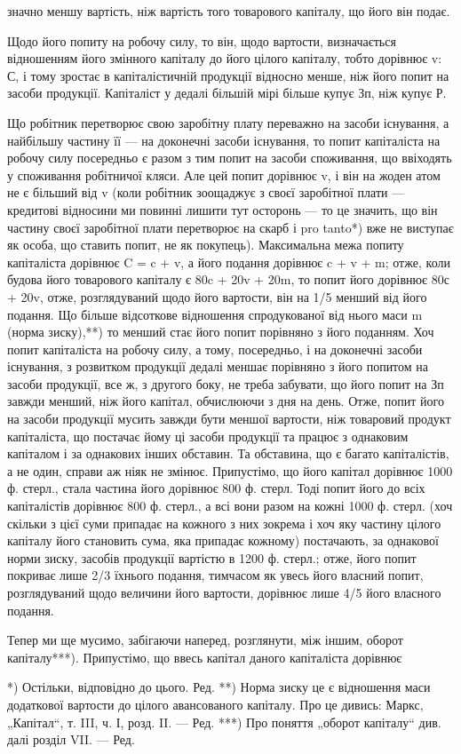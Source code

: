 значно меншу вартість, ніж вартість того товарового капіталу, що
його він подає.

Щодо його попиту на робочу силу, то він, щодо вартости, визначається
відношенням його змінного капіталу до його цілого капіталу,
тобто дорівнює v: С, і тому зростає в капіталістичній продукції
відносно менше, ніж його попит на засоби продукції. Капіталіст
у дедалі більшій мірі більше купує Зп, ніж купує Р.

Що робітник перетворює свою заробітну плату переважно на засоби
існування, а найбільшу частину її — на доконечні засоби існування, то попит
капіталіста на робочу силу посередньо є разом з тим попит на засоби споживання,
що ввіходять у споживання робітничої кляси. Але цей попит
дорівнює v, і він на жоден атом не є більший від v (коли робітник зоощаджує
з своєї заробітної плати — кредитові відносини ми повинні лишити
тут осторонь — то це значить, що він частину своєї заробітної плати
перетворює на скарб і pro tanto*) вже не виступає як особа, що ставить
попит, не як покупець). Максимальна межа попиту капіталіста дорівнює
C = c + v, а його подання дорівнює c + v + m; отже, коли будова
його товарового капіталу є 80c + 20v + 20m, то попит його дорівнює
80с + 20v, отже, розглядуваний щодо його вартости, він на 1/5 менший
від його подання. Що більше відсоткове відношення спродукованої від нього
маси m (норма зиску),**) то менший стає його попит порівняно з його
поданням. Хоч попит капіталіста на робочу силу, а тому, посередньо, і
на доконечні засоби існування, з розвитком продукції дедалі меншає порівняно
з його попитом на засоби продукції, все ж, з другого боку, не
треба забувати, що його попит на Зп завжди менший, ніж його капітал,
обчислюючи з дня на день. Отже, попит його на засоби продукції
мусить завжди бути меншої вартости, ніж товаровий продукт капіталіста,
що постачає йому ці засоби продукції та працює з однаковим
капіталом і за однакових інших обставин. Та обставина, що є
багато капіталістів, а не один, справи аж ніяк не змінює. Припустімо,
що його капітал дорівнює 1000 ф. стерл., стала частина його дорівнює
800 ф. стерл. Тоді попит його до всіх капіталістів дорівнює 800 ф. стерл.,
а всі вони разом на кожні 1000 ф. стерл. (хоч скільки з цієї суми припадає
на кожного з них зокрема і хоч яку частину цілого капіталу його
становить сума, яка припадає кожному) постачають, за однакової норми
зиску, засобів продукції вартістю в 1200 ф. стерл.; отже, його попит покриває
лише 2/3 їхнього подання, тимчасом як увесь його власний попит,
розглядуваний щодо величини його вартости, дорівнює лише 4/5
його власного подання.

Тепер ми ще мусимо, забігаючи наперед, розглянути, між іншим, оборот
капіталу***). Припустімо, що ввесь капітал даного капіталіста дорівнює

*) Остільки, відповідно до цього. Ред.
**) Норма зиску це є відношення маси додаткової вартости до цілого авансованого
капіталу. Про це дивись: Маркс, „Капітал“, т. III, ч. І, розд. II. —
Ред.
***) Про поняття „оборот капіталу“ див. далі розділ VII. — Ред.
